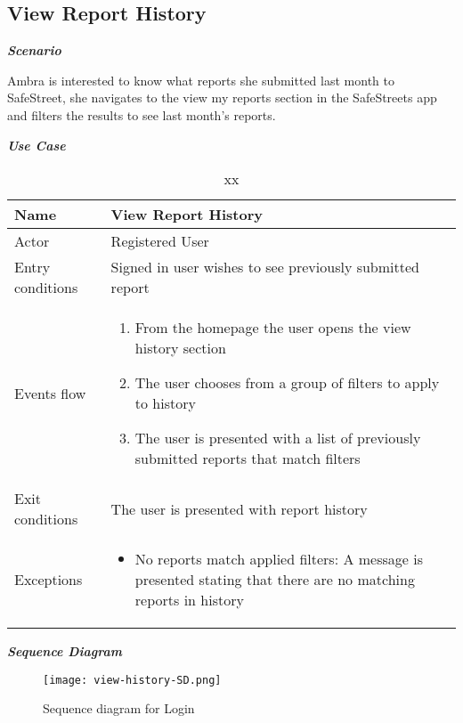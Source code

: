 \subsection{View Report History}

\emph{\textbf{Scenario}}

Ambra is interested to know what reports she submitted last month to SafeStreet, she navigates to the view my reports section in the SafeStreets app and filters the results to see last month’s reports.

\emph{\textbf{Use Case}}

\begin{table}[!hbtp]
\footnotesize
\centering
\settowidth{}
\setlength\extrarowheight{2pt}
\begin{tabulary}{\textwidth}{|J|J|}
\hline
Name             & View Report History \\
\hline 
Actor            & Registered User \\ 
\hline 
Entry conditions & Signed in user wishes to see previously submitted report\\
\hline 
Events flow      & 
\begin{minipage}[t]{0.7\textwidth}
\begin{enumerate} 
\item From the homepage the user opens the view history section
\item The user chooses from a group of filters to apply to history
\item The user is presented with a list of previously submitted reports that match filters
\end{enumerate}
\end{minipage}\\
\hline
Exit conditions  & The user is presented with report history \\
\hline 
Exceptions       & 
\begin{minipage}[t]{0.8\textwidth}
\begin{itemize} 
\item No reports match applied filters: A message is presented stating that there are no matching reports in history
\end{itemize}
\end{minipage}\\
\hline
\end{tabulary}
\caption{\label{tab:xx}xx}
\end{table}
\emph{\textbf{Sequence Diagram}}
\begin{figure}[H]
\caption{Sequence diagram for Login}
\label{fig:SD-login}
\centering
\texttt{[image: view-history-SD.png]}
\end{figure}
